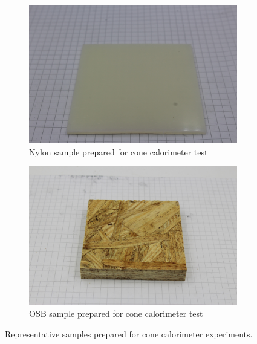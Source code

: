 \documentclass[12pt,oneside]{book}
\begin{document}
\begin{figure}[H]
    \centering
    \begin{subfigure}[b]{0.475\textwidth}
        \centering
        \includegraphics[width=\textwidth]{Figures/Nylon.jpg}
        \caption{Nylon sample prepared for cone calorimeter test}
    \end{subfigure}
    \hfill
    \begin{subfigure}[b]{0.475\textwidth}
        \centering
        \includegraphics[width=\textwidth]{Figures/OSB.jpg}
        \caption{OSB sample prepared for cone calorimeter test}
    \end{subfigure}
    \caption[Representative Samples Prepared for Cone Calorimeter Experiments] {Representative samples prepared for cone calorimeter experiments.} 
    \label{fig:cone_sample}
\end{figure}
\end{document}
